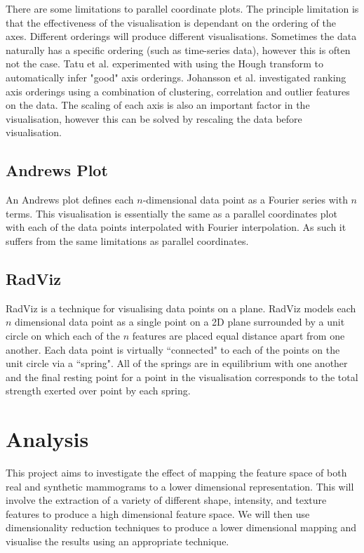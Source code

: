 There are some limitations to parallel coordinate plots. The principle limitation is that the effectiveness of the visualisation is dependant on the ordering of the axes. Different orderings will produce different visualisations. Sometimes the data naturally has a specific ordering (such as time-series data), however this is often not the case. Tatu et al. \cite{tatu2009combining} experimented with using the Hough transform to automatically infer "good" axis orderings. Johansson et al. \cite{johansson2009interactive} investigated ranking axis orderings using a combination of clustering, correlation and outlier features on the data. The scaling of each axis is also an important factor in the visualisation, however this can be solved by rescaling the data before visualisation.

\subsection{Andrews Plot}
An Andrews plot defines each $n$-dimensional data point as a Fourier series with $n$ terms. This visualisation is essentially the same as a parallel coordinates plot with each of the data points interpolated with Fourier interpolation. As such it suffers from the same limitations as parallel coordinates.

\subsection{RadViz}
RadViz \cite{novakova2009radviz} is a technique for visualising data points on a plane. RadViz models each $n$ dimensional data point as a single point on a 2D plane surrounded by a unit circle on which each of the $n$ features are placed equal distance apart from one another. Each data point is virtually ``connected" to each of the points on the unit circle via a ``spring". All of the springs are in equilibrium with one another and the final resting point for a point in the visualisation corresponds to the total strength exerted over point by each spring.

\section{Analysis}
This project aims to investigate the effect of mapping the feature space of both real and synthetic mammograms to a lower dimensional representation. This will involve the extraction of a variety of different shape, intensity, and texture features to produce a high dimensional feature space. We will then use dimensionality reduction techniques to produce a lower dimensional mapping and visualise the results using an appropriate technique. 


